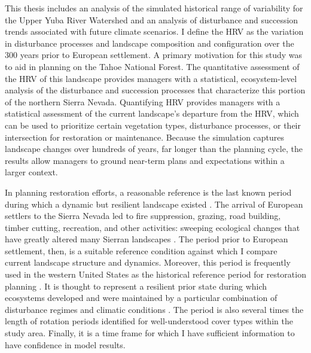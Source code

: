 This thesis includes an analysis of the simulated historical range of variability for the Upper Yuba River Watershed and an analysis of disturbance and succession trends associated with future climate scenarios. I define the HRV as the variation in disturbance processes and landscape composition and configuration over the 300 years prior to European settlement. A primary motivation for this study was to aid in planning on the Tahoe National Forest. The quantitative assessment of the HRV of this landscape provides managers with a statistical, ecosystem-level analysis of the disturbance and succession processes that characterize this portion of the northern Sierra Nevada. Quantifying HRV provides managers with a statistical assessment of the current landscape's departure from the HRV, which can be used to prioritize certain vegetation types, disturbance processes, or their intersection for restoration or maintenance. Because the simulation captures landscape changes over hundreds of years, far longer than the planning cycle, the results allow managers to ground near-term plans and expectations within a larger context. 

In planning restoration efforts, a reasonable reference is the last known period during which a dynamic but resilient landscape existed \citep{Swetnam1999}. The arrival of European settlers to the Sierra Nevada led to fire suppression, grazing, road building, timber cutting, recreation, and other activities: sweeping ecological changes that have greatly altered many Sierran landscapes \citep{Storer1963,Stephens2015,Knapp2013,Hessburg2005}. The period prior to European settlement, then, is a suitable reference condition against which I compare current landscape structure and dynamics. Moreover, this period is frequently used in the western United States as the historical reference period for restoration planning \citep{Safford2013}. It is thought to represent a resilient prior state during which ecosystems developed and were maintained by a particular combination of disturbance regimes and climatic conditions \citep{VandeWater2011,Meyer2013}. The period is also several times the length of rotation periods identified for well-understood cover types within the study area. Finally, it is a time frame for which I have sufficient information to have confidence in model results. 

